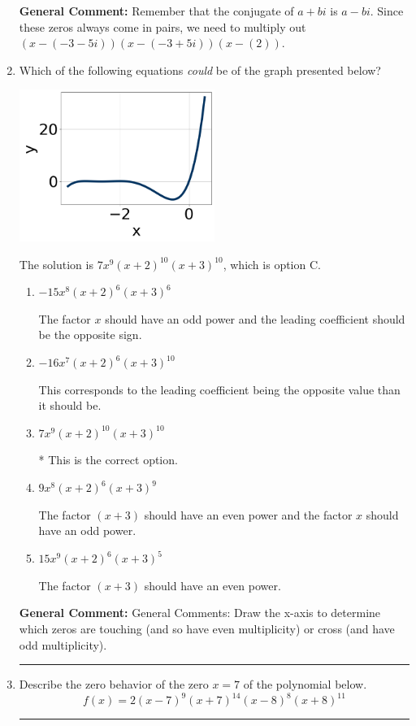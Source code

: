 \documentclass{extbook}[14pt]
\newcommand{\litem}[1]{\item #1

\rule{\textwidth}{0.4pt}}
\begin{document}
\begin{enumerate}
{\textbf{General Comment:} Remember that the conjugate of $a+bi$ is $a-bi$. Since these zeros always come in pairs, we need to multiply out $(x-(-3 - 5 i))(x-(-3 + 5 i))(x-(2))$.
}
\litem{
Which of the following equations \textit{could} be of the graph presented below?

\begin{center}
    \includegraphics[width=0.5\textwidth]{../Figures/polyGraphToFunctionCopyA.png}
\end{center}




The solution is \( 7x^{9} (x + 2)^{10} (x + 3)^{10} \), which is option C.\begin{enumerate}[label=\Alph*.]
\item \( -15x^{8} (x + 2)^{6} (x + 3)^{6} \)

The factor $x$ should have an odd power and the leading coefficient should be the opposite sign.
\item \( -16x^{7} (x + 2)^{6} (x + 3)^{10} \)

This corresponds to the leading coefficient being the opposite value than it should be.
\item \( 7x^{9} (x + 2)^{10} (x + 3)^{10} \)

* This is the correct option.
\item \( 9x^{8} (x + 2)^{6} (x + 3)^{9} \)

The factor $(x + 3)$ should have an even power and the factor $x$ should have an odd power.
\item \( 15x^{9} (x + 2)^{6} (x + 3)^{5} \)

The factor $(x + 3)$ should have an even power.
\end{enumerate}

\textbf{General Comment:} General Comments: Draw the x-axis to determine which zeros are touching (and so have even multiplicity) or cross (and have odd multiplicity).
}
\litem{
Describe the zero behavior of the zero $x = 7$ of the polynomial below.
\[ f(x) = 2(x - 7)^{9}(x + 7)^{14}(x - 8)^{8}(x + 8)^{11} \]

}
\end{enumerate}
\end{document}
